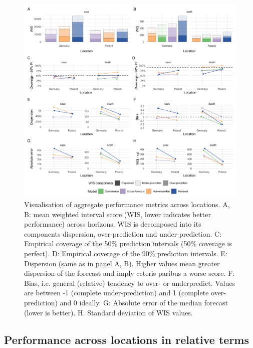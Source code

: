 \documentclass[10pt,letterpaper]{article}
\begin{document}
\begin{figure}[H]
\includegraphics[width=1\linewidth,]{../analysis/plots/aggregate-performance-2-weeks-locations-all-v4} \caption{Visualisation of aggregate performance metrics across locations. A, B: mean weighted interval score (WIS, lower indicates better performance) across horizons. WIS is decomposed into its components dispersion, over-prediction and under-prediction. C: Empirical coverage of the 50\% prediction intervals (50\% coverage is perfect). D: Empirical coverage of the 90\% prediction intervals. E: Dispersion (same as in panel A, B). Higher values mean greater dispersion of the forecast and imply ceteris paribus a worse score. F: Bias, i.e. general (relative) tendency to over- or underpredict. Values are between -1 (complete under-prediction) and 1 (complete over-prediction) and 0 ideally. G: Absolute error of the median forecast (lower is better). H. Standard deviation of WIS values.}\label{fig:performance-locations}
\end{figure}

\hypertarget{performance-across-locations-in-relative-terms}{%
\subsection{Performance across locations in relative
terms}\label{performance-across-locations-in-relative-terms}}
\end{document}
